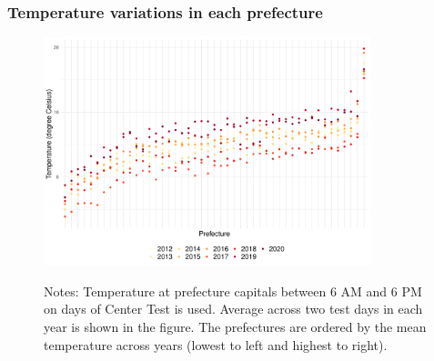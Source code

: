 \documentclass[10pt, pdfmx,hiresbb]{beamer}
\begin{document}
\begin{frame}\frametitle{Temperature variations in each prefecture}
  \label{temp_dev_1}
  \begin{center}
    \begin{figure}
      \includegraphics[width=9.5cm]{../Output/images/temperature_diff.pdf}
      \tiny
      \begin{tablenotes}
      \item Notes:
        Temperature at prefecture capitals between 6 AM and 6 PM on days of Center Test is used.
        Average across two test days in each year is shown in the figure.
        The prefectures are ordered by the mean temperature across years (lowest to left and highest to right).
      \end{tablenotes}
    \end{figure}
  \end{center}
  \hyperlink{est_eq}{}
\end{frame}
\end{document}
